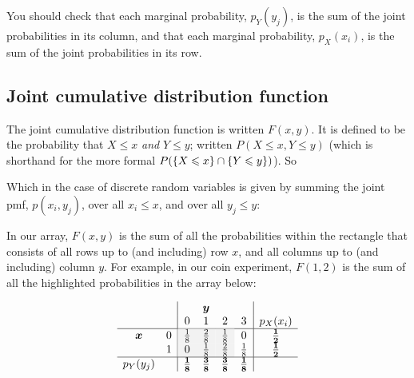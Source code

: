 You should check that each marginal probability, $p_Y(y_j)$, is the sum of the joint probabilities in its column, and that each marginal probability, $p_X(x_i)$, is the sum of the joint probabilities in its row.

\subsection{Joint cumulative distribution function} \label{joint cdf}
The joint cumulative distribution function is written $F(x,y)$. It is defined to be the probability that $X \leq x$ \; \textit{and} \; $Y \leq y$; written $P(X \leq x, Y \leq y)$ (which is shorthand for the more formal $P(\left\{X \leqslant x\right\} \cap \left\{Y \leqslant y\right\})$). So

  	\bigskip
	
	\hfil{}
	\bigskip

\noindent Which in the case of discrete random variables is given by summing the joint pmf, $p(x_i,y_j)$, over all $x_i \leq x$, and over all $y_j \leq y$: 

  	\bigskip
	
	\hfil{}
	\bigskip

\noindent In our array, $F(x,y)$ is the sum of all the probabilities within the rectangle that consists of all rows up to (and including) row $x$, and all columns up to (and including) column $y$. For example, in our coin experiment, $F(1,2)$ is the sum of all the highlighted probabilities in the array below:

\[
\begin{array}{cc|cccc|c} 
&& \multicolumn{3}{c}{\boldsymbol{y}} & \\
&& \multicolumn{1}{c}{0} &  \multicolumn{1}{c}{1} &  \multicolumn{1}{c}{2} &  3 & p_X(x_i) \\ \hline

$$\boldsymbol{x}$$ \multirow{3}{*}{$$} &0&   \cellcolor{gray!10} \frac{1}{8} & \cellcolor{gray!10} \frac{2}{8} & \cellcolor{gray!10} \frac{1}{8} & 0 &\boldsymbol{\frac{1}{2}}  \\ 
	                        &1& \cellcolor{gray!10}    0                 &  \cellcolor{gray!10} \frac{1}{8} &  \cellcolor{gray!10} \frac{2}{8} & \frac{1}{8} & \boldsymbol{\frac{1}{2}} \\ \hline
\multicolumn{1}{c}{p_Y(y_j)} &&\boldsymbol{\frac{1}{8}}&\boldsymbol{\frac{3}{8}}&\boldsymbol{\frac{3}{8}}&\boldsymbol{\frac{1}{8}}
\end{array}
\]


